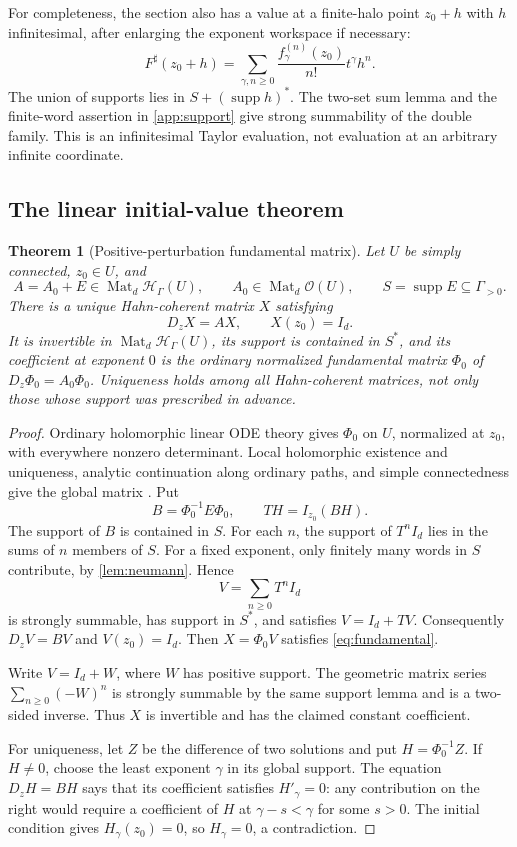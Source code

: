 \documentclass[11pt,letterpaper]{article}
\numberwithin{equation}{section}
\newtheorem{theorem}{Theorem}[section]
\theoremstyle{definition}
\theoremstyle{remark}
\newcommand{\OO}{\mathcal O}
\newcommand{\HH}{\mathscr H}
\newcommand{\supp}{\operatorname{supp}}
\newcommand{\Mat}{\operatorname{Mat}}
\begin{document}
For completeness, the section also has a value at a finite-halo point
$z_0+h$ with $h$ infinitesimal, after enlarging the exponent workspace if
necessary:
\[
 F^\sharp(z_0+h)=
 \sum_{\gamma,n\ge0}\frac{f_\gamma^{(n)}(z_0)}{n!}t^\gamma h^n.
\]
The union of supports lies in $S+(\supp h)^*$. The two-set sum lemma and the
finite-word assertion in \cref{app:support} give strong summability of the
double family. This is an infinitesimal Taylor evaluation, not evaluation
at an arbitrary infinite coordinate.

\subsection{The linear initial-value theorem}
\begin{theorem}[Positive-perturbation fundamental matrix]
\label{thm:coherentlinear}
Let $U$ be simply connected, $z_0\in U$, and
\[
 A=A_0+E\in\Mat_d\HH_\Gamma(U),
 \qquad A_0\in\Mat_d\OO(U),
 \qquad S=\supp E\subseteq\Gamma_{>0}.
\]
There is a unique Hahn-coherent matrix $X$ satisfying
\begin{equation}\label{eq:fundamental}
 D_zX=AX,\qquad X(z_0)=I_d.
\end{equation}
It is invertible in $\Mat_d\HH_\Gamma(U)$, its support is contained in
$S^*$, and its coefficient at exponent $0$ is the ordinary normalized
fundamental matrix $\Phi_0$ of $D_z\Phi_0=A_0\Phi_0$.
Uniqueness holds among all Hahn-coherent matrices, not only those whose
support was prescribed in advance.
\end{theorem}
\begin{proof}
Ordinary holomorphic linear ODE theory gives $\Phi_0$ on $U$, normalized at
$z_0$, with everywhere nonzero determinant. Local holomorphic existence and
uniqueness, analytic continuation along ordinary paths, and simple
connectedness give the global matrix \cite[Chapter 4]{Teschl}.
Put
\[
 B=\Phi_0^{-1}E\Phi_0,
 \qquad TH=I_{z_0}(BH).
\]
The support of $B$ is contained in $S$. For each $n$, the support of
$T^nI_d$ lies in the sums of $n$ members of $S$. For a fixed exponent,
only finitely many words in $S$ contribute, by \cref{lem:neumann}. Hence
\begin{equation}\label{eq:peano}
 V=\sum_{n\ge0}T^nI_d
\end{equation}
is strongly summable, has support in $S^*$, and satisfies
$V=I_d+TV$. Consequently $D_zV=BV$ and $V(z_0)=I_d$.
Then $X=\Phi_0V$ satisfies \eqref{eq:fundamental}.

Write $V=I_d+W$, where $W$ has positive support. The geometric matrix
series $\sum_{n\ge0}(-W)^n$ is strongly summable by the same support lemma
and is a two-sided inverse. Thus $X$ is invertible and has the claimed
constant coefficient.

For uniqueness, let $Z$ be the difference of two solutions and put
$H=\Phi_0^{-1}Z$. If $H\ne0$, choose the least exponent $\gamma$ in its
global support. The equation $D_zH=BH$ says that its coefficient satisfies
$H'_\gamma=0$: any contribution on the right would require a coefficient
of $H$ at $\gamma-s<\gamma$ for some $s>0$. The initial condition gives
$H_\gamma(z_0)=0$, so $H_\gamma=0$, a contradiction.
\end{proof}
\end{document}
